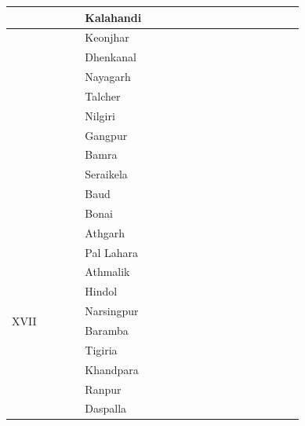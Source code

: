 \begin{longtable}{|p{0.23\linewidth}|p{0.23\linewidth}|p{0.23\linewidth}|p{0.23\linewidth}|}
 \\
\hline
 & Kalahandi

 \\
\hline
 & Keonjhar

 \\
\hline
 & Dhenkanal

 \\
\hline
 & Nayagarh

 \\
\hline
 & Talcher

 \\
\hline
 & Nilgiri

 \\
\hline
 & Gangpur

 \\
\hline
 & Bamra

 \\
\hline
 & Seraikela

 \\
\hline
 & Baud

 \\
\hline
 & Bonai

 \\
\hline
\multirow{12}{*}{XVII























} & Athgarh

 \\
\hline
 & Pal Lahara

 \\
\hline
 & Athmalik

 \\
\hline
 & Hindol

 \\
\hline
 & Narsingpur

 \\
\hline
 & Baramba

 \\
\hline
 & Tigiria

 \\
\hline
 & Khandpara

 \\
\hline
 & Ranpur

 \\
\hline
 & Daspalla


\end{longtable}
